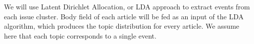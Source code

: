  We will use Latent Dirichlet Allocation, or LDA approach to extract events from each issue cluster. Body field of each article will be fed as an input of the LDA algorithm, which produces the topic distribution for every article. We assume here that each topic corresponds to a single event. 